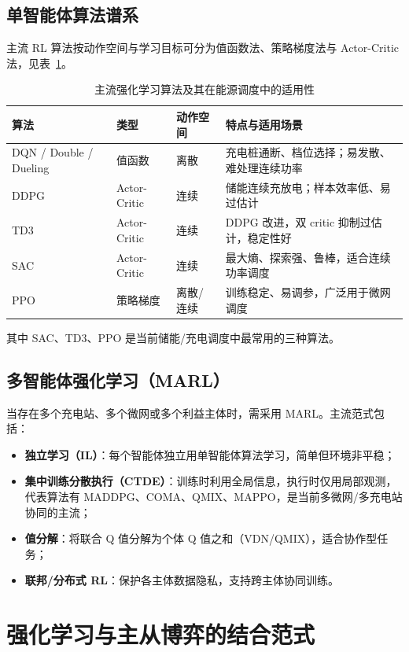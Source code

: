\documentclass[UTF8,a4paper,11pt]{ctexart}
\begin{document}
\subsection{单智能体算法谱系}
主流 RL 算法按动作空间与学习目标可分为值函数法、策略梯度法与 Actor-Critic 法，见表~\ref{tab:algo}。

\begin{table}[htbp]
\centering
\small
\caption{主流强化学习算法及其在能源调度中的适用性}
\label{tab:algo}
\begin{tabular}{p{2.1cm} p{2.6cm} p{2.6cm} p{6.4cm}}
\toprule
\textbf{算法} & \textbf{类型} & \textbf{动作空间} & \textbf{特点与适用场景}\\
\midrule
DQN / Double / Dueling & 值函数 & 离散 & 充电桩通断、档位选择；易发散、难处理连续功率\\
DDPG & Actor-Critic & 连续 & 储能连续充放电；样本效率低、易过估计\\
TD3 & Actor-Critic & 连续 & DDPG 改进，双 critic 抑制过估计，稳定性好\\
SAC & Actor-Critic & 连续 & 最大熵、探索强、鲁棒，适合连续功率调度\\
PPO & 策略梯度 & 离散/连续 & 训练稳定、易调参，广泛用于微网调度\\
\bottomrule
\end{tabular}
\end{table}

其中 SAC、TD3、PPO 是当前储能/充电调度中最常用的三种算法\cite{ref11,ref14,ref17}。

\subsection{多智能体强化学习（MARL）}
当存在多个充电站、多个微网或多个利益主体时，需采用 MARL。主流范式包括：
\begin{itemize}
  \item \textbf{独立学习（IL）}：每个智能体独立用单智能体算法学习，简单但环境非平稳；
  \item \textbf{集中训练分散执行（CTDE）}：训练时利用全局信息，执行时仅用局部观测，代表算法有 MADDPG、COMA、QMIX、MAPPO，是当前多微网/多充电站协同的主流\cite{ref6,ref20,ref21}；
  \item \textbf{值分解}：将联合 Q 值分解为个体 Q 值之和（VDN/QMIX），适合协作型任务；
  \item \textbf{联邦/分布式 RL}：保护各主体数据隐私，支持跨主体协同训练\cite{ref18,ref19}。
\end{itemize}

\section{强化学习与主从博弈的结合范式}
\end{document}
